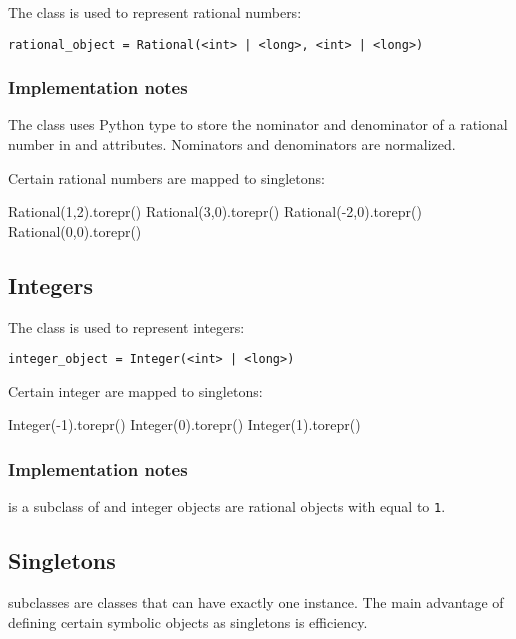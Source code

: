 \documentclass[a4paper,12pt]{article}
\renewcommand{\keyword}[1]{\texttt{\color{magenta}#1}}
\begin{document}
The  class is used to represent rational numbers:
\begin{verbatim}
rational_object = Rational(<int> | <long>, <int> | <long>)
\end{verbatim}

\subsubsection{Implementation notes}

The  class uses Python  type to store the
nominator and denominator of a rational number in  and
 attributes. Nominators and denominators are
normalized.

Certain rational numbers are mapped to singletons:
\begin{python}
Rational(1,2).torepr()
Rational(3,0).torepr()
Rational(-2,0).torepr()
Rational(0,0).torepr()
\end{python}

\subsection{Integers}
\label{sec:integers}

The  class is used to represent integers:
\begin{verbatim}
integer_object = Integer(<int> | <long>)
\end{verbatim}
Certain integer are mapped to singletons:
\begin{python}
Integer(-1).torepr()
Integer(0).torepr()
Integer(1).torepr()
\end{python}

\subsubsection{Implementation notes}

 is a subclass of  and integer objects
are rational objects with  equal to \keyword{1}.

\subsection{Singletons}
\label{sec:singletons}

 subclasses are classes that can have exactly one
instance. The main advantage of defining certain symbolic objects as
singletons is efficiency. 
\end{document}
